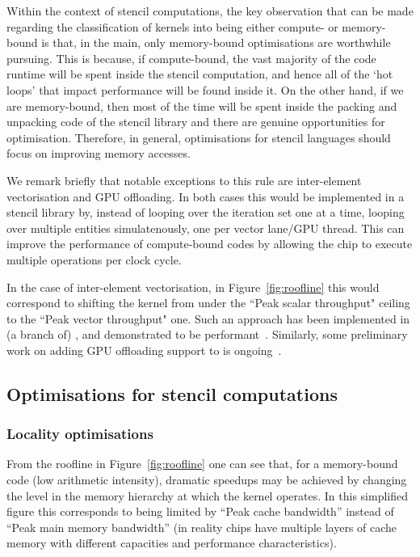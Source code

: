 Within the context of stencil computations, the key observation that can be made regarding the classification of kernels into being either compute- or memory-bound is that, in the main, only memory-bound optimisations are worthwhile pursuing.
This is because, if compute-bound, the vast majority of the code runtime will be spent inside the stencil computation, and hence all of the `hot loops' that impact performance will be found inside it.
On the other hand, if we are memory-bound, then most of the time will be spent inside the packing and unpacking code of the stencil library and there are genuine opportunities for optimisation.
Therefore, in general, optimisations for stencil languages should focus on improving memory accesses.

We remark briefly that notable exceptions to this rule are inter-element vectorisation and GPU offloading.
In both cases this would be implemented in a stencil library by, instead of looping over the iteration set one at a time, looping over multiple entities simulatenously, one per vector lane/GPU thread.
This can improve the performance of compute-bound codes by allowing the chip to execute multiple operations per clock cycle.

In the case of inter-element vectorisation, in Figure~\ref{fig:roofline} this would correspond to shifting the kernel from under the ``Peak scalar throughput" ceiling to the ``Peak vector throughput" one.
Such an approach has been implemented in (a branch of) , and demonstrated to be performant~\cite{sunStudyVectorizationMatrixfree2020}.
Similarly, some preliminary work on adding GPU offloading support to  is ongoing~\cite{fenics2021-kulkarni}.

\subsection{Optimisations for stencil computations}
\label{sec:background_opt}

\subsubsection{Locality optimisations}
\label{sec:background_opt_locality}

From the roofline in Figure~\ref{fig:roofline} one can see that, for a memory-bound code (low arithmetic intensity), dramatic speedups may be achieved by changing the level in the memory hierarchy at which the kernel operates.
In this simplified figure this corresponds to being limited by ``Peak cache bandwidth'' instead of ``Peak main memory bandwidth'' (in reality chips have multiple layers of cache memory with different capacities and performance characteristics).

